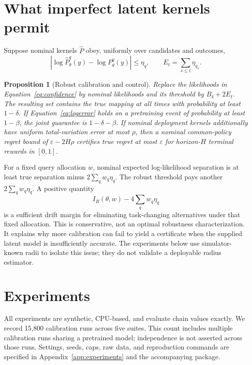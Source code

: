\documentclass{article}
\newtheorem{proposition}[theorem]{Proposition}
\begin{document}
\section{What imperfect latent kernels permit}
Suppose nominal kernels $\widehat P$ obey, uniformly over candidates and outcomes,
\begin{equation}
|\log\widehat P_\theta^q(y)-\log P_\theta^q(y)|\le\eta_q,
\qquad E_t=\sum_{s\le t}\eta_{q_s}. \label{eq:logerror}
\end{equation}
\begin{proposition}[Robust calibration and control]\label{prop:robust}
Replace the likelihoods in Equation~\eqref{eq:confidence} by nominal likelihoods and its threshold by $B_\delta+2E_t$. The resulting set contains the true mapping at all times with probability at least $1-\delta$. If Equation~\eqref{eq:logerror} holds on a pretraining event of probability at least $1-\beta$, the joint guarantee is $1-\delta-\beta$. If nominal deployment kernels additionally have uniform total-variation error at most $\rho$, then a nominal common-policy regret bound of $\varepsilon-2H\rho$ certifies true regret at most $\varepsilon$ for horizon-$H$ terminal rewards in $[0,1]$.
\end{proposition}
For a fixed query allocation $w$, nominal expected log-likelihood separation is at least true separation minus $2\sum_qw_q\eta_q$. The robust threshold pays another $2\sum_qw_q\eta_q$. A positive quantity
\begin{equation}
I_R(\theta,w)-4\sum_qw_q\eta_q \label{eq:robustmargin}
\end{equation}
is a sufficient drift margin for eliminating task-changing alternatives under that fixed allocation. This is conservative, not an optimal robustness characterization. It explains why more calibration can fail to yield a certificate when the supplied latent model is insufficiently accurate. The experiments below use simulator-known radii to isolate this issue; they do not validate a deployable radius estimator.

\section{Experiments}\label{sec:experiments}
All experiments are synthetic, CPU-based, and evaluate chain values exactly. We record 15,800 calibration runs across five suites. This count includes multiple calibration runs sharing a pretrained model; independence is not asserted across those runs. Settings, seeds, caps, raw data, and reproduction commands are specified in Appendix~\ref{app:experiments} and the accompanying package.
\end{document}
